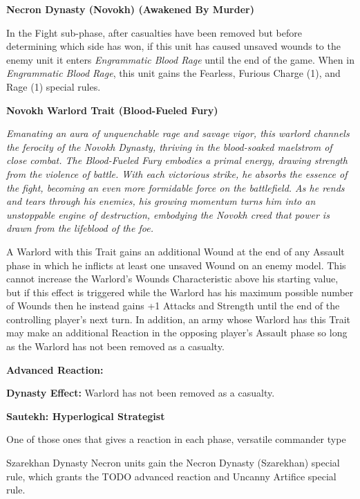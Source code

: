 \begin{multicols}{2}
	\textbf{Necron Dynasty (Novokh) (Awakened By Murder)}
	
	In the Fight sub-phase, after casualties have been removed but before determining which side has won, if this unit has caused unsaved wounds to the enemy unit it enters \textit{Engrammatic Blood Rage} until the end of the game. When in \textit{Engrammatic Blood Rage}, this unit gains the Fearless, Furious Charge (1), and Rage (1) special rules.
	
	\textbf{Novokh Warlord Trait (Blood-Fueled Fury)}
	
	\textit{Emanating an aura of unquenchable rage and savage vigor, this warlord channels the ferocity of the Novokh Dynasty, thriving in the blood-soaked maelstrom of close combat. The Blood-Fueled Fury embodies a primal energy, drawing strength from the violence of battle. With each victorious strike, he absorbs the essence of the fight, becoming an even more formidable force on the battlefield. As he rends and tears through his enemies, his growing momentum turns him into an unstoppable engine of destruction, embodying the Novokh creed that power is drawn from the lifeblood of the foe.}
	
	A Warlord with this Trait gains an additional Wound at the end of any Assault phase in which he inflicts at least one unsaved Wound on an enemy model. This cannot increase the Warlord’s Wounds Characteristic above his starting value, but if this effect is triggered while the Warlord has his maximum possible number of Wounds then he instead gains +1 Attacks and Strength until the end of the controlling player’s next turn. In addition, an army whose Warlord has this Trait may make an additional Reaction in the opposing player’s Assault phase so long as the Warlord has not been removed as a casualty.
\end{multicols}



\newpage
{}

\textbf{Advanced Reaction:}

\textbf{Dynasty Effect:}
Warlord has not been removed as a casualty.

\textbf{Sautekh: Hyperlogical Strategist}

One of those ones that gives a reaction in each phase, versatile commander type


\newpage
{}

Szarekhan Dynasty Necron units gain the Necron Dynasty (Szarekhan) special rule, which grants the TODO advanced reaction and Uncanny Artifice special rule.

